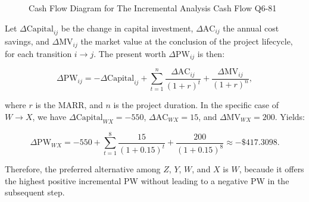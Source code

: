 \documentclass[12pt]{article}
\begin{document}
\begin{figure}[!ht]
    \centering
    \caption{Cash Flow Diagram for The Incremental Analysis Cash Flow Q6-81}
    \label{fig:incremental-analysis-cash-flow}
\end{figure}

Let \(\Delta \text{Capital}_{ij}\) be the change in capital investment, \(\Delta \text{AC}_{ij}\) the annual cost savings, and \(\Delta \text{MV}_{ij}\) the market value at the conclusion of the project lifecycle, for each transition \(i \rightarrow j\). The present worth \(\Delta \text{PW}_{ij}\) is then:

\[
\Delta \text{PW}_{ij} = -\Delta \text{Capital}_{ij} + \sum_{t=1}^{n} \frac{\Delta \text{AC}_{ij}}{(1 + r)^t} + \frac{\Delta \text{MV}_{ij}}{(1 + r)^n},
\]

where \(r\) is the MARR, and \(n\) is the project duration. In the specific case of \(W \rightarrow X\), we have \(\Delta \text{Capital}_{WX} = -550\), \(\Delta \text{AC}_{WX} = 15\), and \(\Delta \text{MV}_{WX} = 200\). Yields:

\[
\Delta \text{PW}_{WX} = -550 + \sum_{t=1}^{8} \frac{15}{(1 + 0.15)^t} + \frac{200}{(1 + 0.15)^8} \approx -\$417.3098.
\]

Therefore, the preferred alternative among \(Z\), \(Y\), \(W\), and \(X\) is \(W\), becaude it offers the highest positive incremental PW without leading to a negative PW in the subsequent step.
\end{document}
